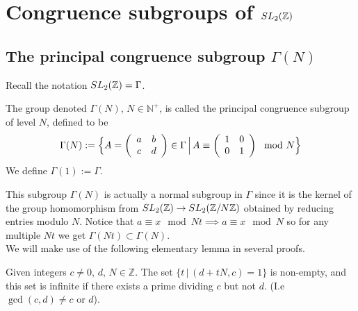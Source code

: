 


\chapter{Congruence subgroups of $SL_2(\mathbb{Z})$}

\section{The principal congruence subgroup $\Gamma(N)$}
Recall the notation $SL_2(\mathbb{Z}) = \Gamma$. 
\begin{definition} The group denoted $\Gamma(N)$,  $N \in \mathbb{N^+}$, is called the principal congruence subgroup of level $N$, defined to be
$$\Gamma(N) := \Big  \lbrace  A= \left(\begin{array}{ c c } a & b \\ c & d \end{array} \right) \in \Gamma \, \Big \vert \, A \equiv   \left(\begin{array}{ c c } 1 & 0 \\ 0 & 1 \end{array} \right) \mod N \Big  \rbrace$$
We define $\Gamma(1)  := \Gamma$.
\end{definition}
This subgroup $\Gamma(N)$ is actually a normal subgroup in $\Gamma$ since it is the kernel of the group homomorphism from $SL_2(\mathbb{Z}) \rightarrow SL_2(\mathbb{Z}/N\mathbb{Z})$ obtained by reducing entries modulo $N$. Notice that $a \equiv x \mod Nt \implies a \equiv x \mod N$ so for any multiple $Nt$ we get $\Gamma(Nt) \subset \Gamma(N)$.
\\
We will make use of the following elementary lemma in several proofs.
\begin{lemma}\label{lem:elementaryCoprime}
Given integers $c \neq 0,\, d,\, N  \in \mathbb{Z}$. The set $\{t \, \vert \, (d + tN, c) = 1 \}$ is non-empty, and this set is infinite if there exists a prime dividing $c$ but not $d$. (I.e $\gcd(c,d) \neq c \text{ or }  d$).
\end{lemma}
